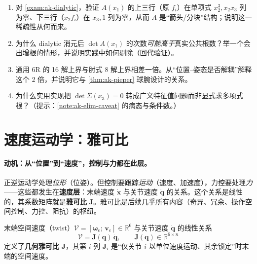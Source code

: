 \begin{practice}
\begin{enumerate}
  \item 对 \cref{exam:ak-dialytic}，验证 $A(x_1)$ 的上三行（原 $f_i$）在单项式 $x_2^3,x_2x_3$ 列为零、下三行（$x_2f_i$）在 $x_3,1$ 列为零，从而 $A$ 是“箭头/分块”结构；说明这一稀疏性从何而来。
  \item 为什么 dialytic 消元后 $\det A(x_1)$ 的次数\emph{可能高于}真实公共根数？举一个会出增根的情形，并说明实践中如何剔除（回代验证）。
  \item 通用 6R 的 16 解上界与肘式 8 解上界相差一倍。从“位置--姿态是否解耦”解释这个 2 倍，并说明它与 \cref{thm:ak-pieper} 球腕设计的关系。
  \item 为什么实用实现把 $\det\bar{\Sigma}(x_3)=0$ 转成广义特征值问题而非显式求多项式根？（提示：\cref{note:ak-elim-caveat} 的病态与条件数。）
\end{enumerate}
\end{practice}

\section{速度运动学：雅可比}
\label{sec:ak-jacobian}

\paragraph{动机：从“位置”到“速度”，控制与力都在此层。}
正逆运动学处理\emph{位形}（位姿）。但控制要跟踪\emph{运动}（速度、加速度），力控要处理\emph{力}——这些都发生在\textbf{速度层}：末端速度 $\dot{\mathbf{x}}$ 与关节速度 $\dot{\mathbf{q}}$ 的关系。这个关系是线性的，其系数矩阵就是\textbf{雅可比} $\mathbf{J}$。雅可比是后续几乎所有内容（奇异、冗余、操作空间控制、力控、阻抗）的枢纽。

\begin{definition}[几何雅可比]\label{def:ak-jacobian}
末端空间速度（twist）$\boldsymbol{\mathcal{V}}=[\boldsymbol{\omega}_e;\,\mathbf{v}_e]\in\mathbb{R}^6$ 与关节速度 $\dot{\mathbf{q}}$ 的线性关系
\begin{equation}
  \boldsymbol{\mathcal{V}}=\mathbf{J}(\mathbf{q})\,\dot{\mathbf{q}},\qquad \mathbf{J}(\mathbf{q})\in\mathbb{R}^{6\times n}
  \label{eq:ak-jac-def}
\end{equation}
定义了\textbf{几何雅可比} $\mathbf{J}$，其第 $i$ 列 $\mathbf{J}_i$ 是“仅关节 $i$ 以单位速度运动、其余锁定”时末端的空间速度。
\end{definition}

